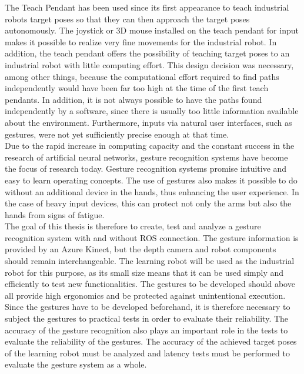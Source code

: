 The Teach Pendant has been used since its first appearance to teach industrial robots target poses so that they can then approach the target poses autonomously. The joystick or 3D mouse installed on the teach pendant for input makes it possible to realize very fine movements for the industrial robot. In addition, the teach pendant offers the possibility of teaching target poses to an industrial robot with little computing effort. This design decision was necessary, among other things, because the computational effort required to find paths independently would have been far too high at the time of the first teach pendants. In addition, it is not always possible to have the paths found independently by a software, since there is usually too little information available about the environment. Furthermore, inputs via natural user interfaces, such as gestures, were not yet sufficiently precise enough at that time.\\

Due to the rapid increase in computing capacity and the constant success in the research of artificial neural networks, gesture recognition systems have become the focus of research today. Gesture recognition systems promise intuitive and easy to learn operating concepts. The use of gestures also makes it possible to do without an additional device in the hands, thus enhancing the user experience. In the case of heavy input devices, this can protect not only the arms but also the hands from signs of fatigue.\\

The goal of this thesis is therefore to create, test and analyze a gesture recognition system with and without ROS connection. The gesture information is provided by an Azure Kinect, but the depth camera and robot components should remain interchangeable. The  learning robot will be used as the industrial robot for this purpose, as its small size means that it can be used simply and efficiently to test new functionalities. The gestures to be developed should above all provide high ergonomics and be protected against unintentional execution. Since the gestures have to be developed beforehand, it is therefore necessary to subject the gestures to practical tests in order to evaluate their reliability. The accuracy of the gesture recognition also plays an important role in the tests to evaluate the reliability of the gestures. The accuracy of the achieved target poses of the  learning robot must be analyzed and latency tests must be performed to evaluate the gesture system as a whole.
